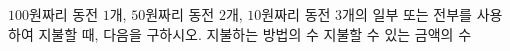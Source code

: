 $100$원짜리 동전 $1$개, $50$원짜리 동전 $2$개, $10$원짜리 동전 $3$개의 일부 또는 전부를 사용하여 지불할 때, 다음을 구하시오. 
 지불하는 방법의 수
 지불할 수 있는 금액의 수
